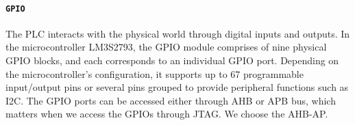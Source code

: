 %
%
%
%






\paragraph{\textbf{\texttt{GPIO}}} The PLC interacts with the physical world through digital inputs and outputs. %
%
%
%
In the microcontroller LM3S2793, the GPIO module comprises of nine physical GPIO blocks, and each corresponds to an individual GPIO port. Depending on the microcontroller's configuration, it supports up to 67 programmable input/output pins or several pins grouped to provide peripheral functions such as I2C. The GPIO ports can be accessed either through AHB or APB bus, which matters when we access the GPIOs through JTAG. We choose the AHB-AP.


